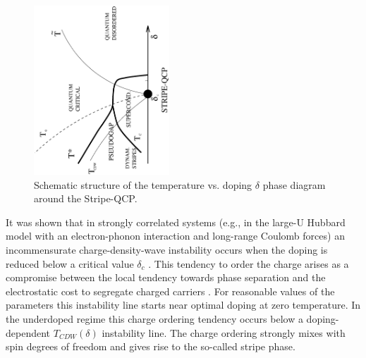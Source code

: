 \documentclass[twoside]{article}
\begin{document}
\begin{figure}
\begin{center}
\includegraphics[width=12pc,height=15pc,angle=-90]{Fig1.ps}
\caption{Schematic structure of the temperature vs. doping $\delta$ phase  diagram around the Stripe-QCP.}
\label{fsmodel}
\end{center}
\end{figure}

It was shown that in strongly correlated systems (e.g., in the
large-U Hubbard model with an
electron-phonon interaction and long-range Coulomb forces) an incommensurate
charge-density-wave instability occurs when the doping is reduced below a
critical value $\delta_c$ \cite{prl95,prb96,jpcs98}. This tendency to order
the charge arises as a compromise between the local tendency towards phase
separation and the electrostatic cost to segregate charged carriers \cite{PS}.
For reasonable values of the parameters this
instability line starts near optimal doping at zero temperature. In the
underdoped regime this charge ordering tendency occurs below a
doping-dependent $T_{CDW}(\delta)$ instability line. The charge ordering
strongly mixes with spin degrees of freedom and gives rise to the so-called
stripe phase.
\end{document}
